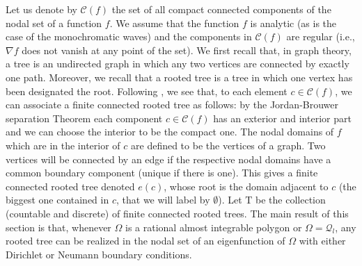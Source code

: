 \documentclass{amsart}
\theoremstyle{definition}
\theoremstyle{remark}
\numberwithin{equation}{section}
\theoremstyle{definition}
\theoremstyle{remark}
\begin{document}
 Let us denote by $\mathcal{C}\left(f\right)$ the set of all compact connected components of the nodal set of a function $f$. We assume that the function $f$ is analytic (as is the case of the monochromatic waves) and the components in $\mathcal{C}\left(f\right)$ are regular (i.e., $\nabla f$ does not vanish at any point of the set). We first recall that, in graph theory, a tree is an undirected graph in which any two vertices are connected by exactly one path. Moreover, we recall that a rooted tree is a tree in which one vertex has been designated the root. Following \cite{Yaiza}, we see that, to each element $c\in\mathcal{C}\left(f\right)$, we can associate a finite connected rooted tree as follows:  by the Jordan-Brouwer separation Theorem each component $c\in\mathcal{C}\left(f\right)$ has an exterior and interior part and we can  choose the interior to be the compact one. The nodal domains of $f$  which are in the interior of $c$ are defined to be the vertices of a graph. Two vertices will be connected by an edge if the respective nodal domains have a common boundary component (unique if there is one). This gives a finite connected rooted tree denoted $e(c)$, whose root is the domain adjacent to $c$ (the biggest one contained in $c$, that we will label by $\emptyset$). Let $\mathrm{T}$ be the collection (countable and discrete) of finite connected rooted trees. The main result of this section is that, whenever $\Omega$ is a rational almost integrable polygon or $\Omega=\mathcal{Q}_l$, any rooted tree can be realized in the nodal set of an eigenfunction of $\Omega$ with either Dirichlet or Neumann boundary conditions. 
\end{document}
